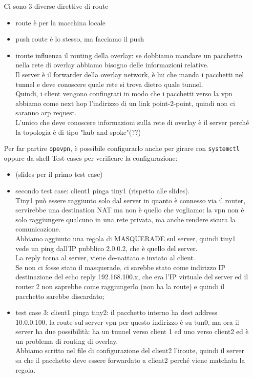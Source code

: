 \documentclass[12pt, oneside]{extbook} %
\begin{document}
Ci sono 3 diverse direttive di route
\begin{itemize}
    \item route è per la macchina locale
    \item push route è lo stesso, ma facciamo il push
    \item iroute influenza il routing della overlay: se dobbiamo mandare un pacchetto nella rete di overlay abbiamo bisogno delle informazioni relative.
    \\Il server è il forwarder della overlay network, è lui che manda i pacchetti nel tunnel e deve conoscere quale rete si trova dietro quale tunnel.
    \\Quindi, i client vengono confiugrati in modo che i pacchetti verso la vpn abbiamo come next hop l'indirizzo di un link point-2-point, quindi non ci saranno arp request.
    \\L'unico che deve conoscere informazioni sulla rete di overlay è il server perché la topologia è di tipo "hub and spoke"(??)
\end{itemize}
Per far partire \texttt{opevpn}, è possibile configurarlo anche per girare con \texttt{systemctl} oppure da shell
Test cases per verificare la configurazione:

\begin{itemize}
    \item (slides per il primo test case)
    \item secondo test case: client1 pinga tiny1 (rispetto alle slides).
    \\Tiny1 può essere raggiunto solo dal server in quanto è connesso via il router, servirebbe una destination NAT ma non è quello che vogliamo: la vpn non è solo raggiungere qualcuno in una rete privata, ma anche rendere sicura la comunicazione.
    \\Abbiamo aggiunto una regola di MASQUERADE sul server, quindi tiny1 vede un ping dall'IP pubblico 2.0.0.2, che è quello del server.
    \\La reply torna al server, viene de-nattato e inviato al client.
    \\Se non ci fosse stato il masquerade, ci sarebbe stato come indirizzo IP destinazione del echo reply 192.168.100.x, che era l'IP virtuale del server ed il router 2 non saprebbe come raggiungerlo (non ha la route) e quindi il pacchetto sarebbe discardato;
    \item test case 3: client1 pinga tiny2: il pacchetto interno ha dest address 10.0.0.100, la route sul server vpn per questo indirizzo è su tun0, ma ora il server ha due possibilità: ha un tunnel verso client 1 ed uno verso client2 ed è un problema di routing di overlay.
    \\Abbiamo scritto nel file di configurazione del client2 l'iroute, quindi il server sa che il pacchetto deve essere forwardato a client2 perché viene matchata la regola.
    \end{itemize}
\end{document}
